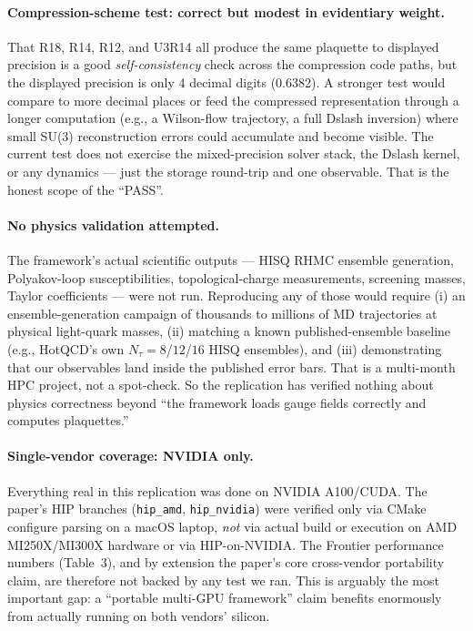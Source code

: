 \documentclass[11pt]{article}
\begin{document}
\paragraph{Compression-scheme test: correct but modest in evidentiary weight.}
That R18, R14, R12, and U3R14 all produce the same plaquette to displayed precision is a good \emph{self-consistency} check across the compression code paths, but the displayed precision is only 4 decimal digits (0.6382). A stronger test would compare to more decimal places or feed the compressed representation through a longer computation (e.g., a Wilson-flow trajectory, a full Dslash inversion) where small SU(3) reconstruction errors could accumulate and become visible. The current test does not exercise the mixed-precision solver stack, the Dslash kernel, or any dynamics --- just the storage round-trip and one observable. That is the honest scope of the ``PASS''.

\paragraph{No physics validation attempted.}
The framework's actual scientific outputs --- HISQ RHMC ensemble generation, Polyakov-loop susceptibilities, topological-charge measurements, screening masses, Taylor coefficients --- were not run. Reproducing any of those would require (i) an ensemble-generation campaign of thousands to millions of MD trajectories at physical light-quark masses, (ii) matching a known published-ensemble baseline (e.g., HotQCD's own $N_\tau{=}8$/$12$/$16$ HISQ ensembles), and (iii) demonstrating that our observables land inside the published error bars. That is a multi-month HPC project, not a spot-check. So the replication has verified nothing about physics correctness beyond ``the framework loads gauge fields correctly and computes plaquettes.''

\paragraph{Single-vendor coverage: NVIDIA only.}
Everything real in this replication was done on NVIDIA A100/CUDA. The paper's HIP branches (\texttt{hip\_amd}, \texttt{hip\_nvidia}) were verified only via CMake configure parsing on a macOS laptop, \emph{not} via actual build or execution on AMD MI250X/MI300X hardware or via HIP-on-NVIDIA. The Frontier performance numbers (Table~3), and by extension the paper's core cross-vendor portability claim, are therefore not backed by any test we ran. This is arguably the most important gap: a ``portable multi-GPU framework'' claim benefits enormously from actually running on both vendors' silicon.
\end{document}
